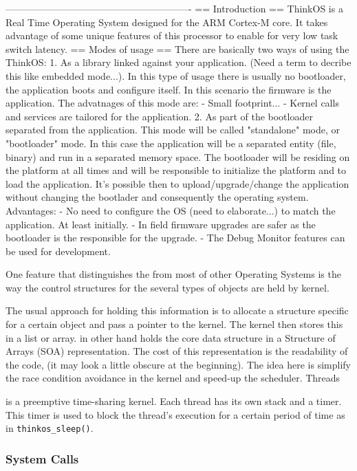 ----------------------------------------------------------
== Introduction ==
ThinkOS is a Real Time Operating System designed for the ARM Cortex-M core. It takes advantage of some unique features of this processor to enable for very low task switch latency.
== Modes of usage ==
There are basically two ways of using the ThinkOS:
1. As a library linked against your application. (Need a term to decribe this like embedded mode...). 
In this type of usage there is usually no bootloader, the application boots and configure itself. In this scenario the firmware is the application. The advatnages of this mode are:
	- Small footprint...
	- Kernel calls and services are tailored for the application.
2. As part of the bootloader separated from the application. This mode will be called "standalone" mode, or "bootloader" mode.
In this case the application will be a separated entity (file, binary) and run in a separated memory space. The bootloader will be residing on the platform at all times and will be responsible to initialize the platform and to load the application. It's possible then to upload/upgrade/change the application without changing the bootlader and consequently the operating system. Advantages:
	- No need to configure the OS (need to elaborate...) to match the application. At least initially.
	- In field firmware upgrades are safer as the bootloader is the responsible for the upgrade.
	- The Debug Monitor features can be used for development.

One feature that distinguishes the \ThinkOS from most of other Operating Systems is the way the control structures for the several types of objects are held by kernel.

The usual approach for holding this information is to allocate a structure specific for a certain object and pass a pointer to the kernel. The kernel then stores this in a list or array. 
\ThinkOS in other hand holds the core data structure in a  Structure of Arrays (SOA) representation. The cost of this representation is the readability of the code, (it may look a little obscure at the beginning). 
The idea here is simplify the race condition avoidance in the kernel and speed-up the scheduler. Threads


\ThinkOS is a preemptive time-sharing kernel. Each thread has its own stack and a timer. This timer is used to block the thread's execution for a certain period of time as in \lstinline{thinkos_sleep()}.

\subsubsection{System Calls}

